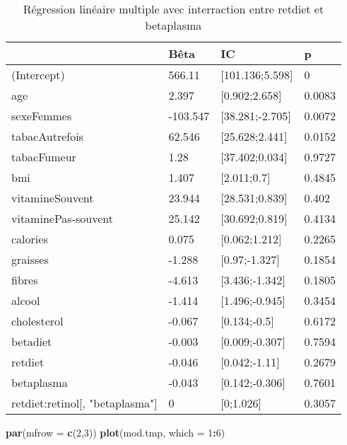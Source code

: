 \documentclass[]{article}
\newenvironment{Shaded}{\begin{snugshade}}{\end{snugshade}}
\newcommand{\KeywordTok}[1]{\textcolor[rgb]{0.13,0.29,0.53}{\textbf{#1}}}
\newcommand{\DataTypeTok}[1]{\textcolor[rgb]{0.13,0.29,0.53}{#1}}
\newcommand{\DecValTok}[1]{\textcolor[rgb]{0.00,0.00,0.81}{#1}}
\newcommand{\OperatorTok}[1]{\textcolor[rgb]{0.81,0.36,0.00}{\textbf{#1}}}
\newcommand{\NormalTok}[1]{#1}
\begin{document}
\begin{table}

\caption{\label{tab:unnamed-chunk-80}Régression linéaire multiple avec interraction entre retdiet et betaplasma}
\centering
\begin{tabular}[t]{l|l|l|l}
\hline
  & Bêta & IC & p\\
\hline
\rowcolor[HTML]{BBD2E1}  (Intercept) & 566.11 & [101.136;5.598] & 0\\
\hline
age & 2.397 & [0.902;2.658] & 0.0083\\
\hline
\rowcolor[HTML]{BBD2E1}  sexeFemmes & -103.547 & [38.281;-2.705] & 0.0072\\
\hline
tabacAutrefois & 62.546 & [25.628;2.441] & 0.0152\\
\hline
\rowcolor[HTML]{BBD2E1}  tabacFumeur & 1.28 & [37.402;0.034] & 0.9727\\
\hline
bmi & 1.407 & [2.011;0.7] & 0.4845\\
\hline
\rowcolor[HTML]{BBD2E1}  vitamineSouvent & 23.944 & [28.531;0.839] & 0.402\\
\hline
vitaminePas-souvent & 25.142 & [30.692;0.819] & 0.4134\\
\hline
\rowcolor[HTML]{BBD2E1}  calories & 0.075 & [0.062;1.212] & 0.2265\\
\hline
graisses & -1.288 & [0.97;-1.327] & 0.1854\\
\hline
\rowcolor[HTML]{BBD2E1}  fibres & -4.613 & [3.436;-1.342] & 0.1805\\
\hline
alcool & -1.414 & [1.496;-0.945] & 0.3454\\
\hline
\rowcolor[HTML]{BBD2E1}  cholesterol & -0.067 & [0.134;-0.5] & 0.6172\\
\hline
betadiet & -0.003 & [0.009;-0.307] & 0.7594\\
\hline
\rowcolor[HTML]{BBD2E1}  retdiet & -0.046 & [0.042;-1.11] & 0.2679\\
\hline
betaplasma & -0.043 & [0.142;-0.306] & 0.7601\\
\hline
\rowcolor[HTML]{BBD2E1}  retdiet:retinol[, "betaplasma"] & 0 & [0;1.026] & 0.3057\\
\hline
\end{tabular}
\end{table}

\begin{Shaded}
\begin{Highlighting}[]
\KeywordTok{par}\NormalTok{(}\DataTypeTok{mfrow =} \KeywordTok{c}\NormalTok{(}\DecValTok{2}\NormalTok{,}\DecValTok{3}\NormalTok{))}
\KeywordTok{plot}\NormalTok{(mod.tmp, }\DataTypeTok{which =} \DecValTok{1}\OperatorTok{:}\DecValTok{6}\NormalTok{)}
\end{Highlighting}
\end{Shaded}
\end{document}
